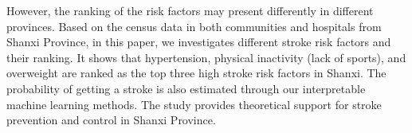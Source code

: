 \documentclass{article}
\begin{document}
 However, the ranking of the risk factors may present differently in different provinces. Based on the census data in both communities and hospitals from Shanxi Province, in this paper, we investigates different stroke risk factors and their ranking. It shows that hypertension, physical inactivity (lack of sports), and overweight are ranked as the top three high stroke risk factors in Shanxi. The probability of getting a stroke is also estimated through our interpretable machine learning methods. The study provides theoretical support for stroke prevention and control in Shanxi Province.
\begin{comment}
\subsection{Summary}
\begin{itemize}
    \setlength{\itemsep}{0pt}
    \setlength{\parsep}{0pt}
    \setlength{\parskip}{0pt}
    \item[1.] We rank the ``8+2" risk factors by using the Decision-Tree Model.
    \item[2.] The ranking of risk factors other than ``8+2" is given by using the Random-Forest Model.
    \item[3.] We quantify the probability of stroke incidence by using the logistic model. The features include lifestyle habits and the ``8+2" factors as these are easily accessible, and residents are able to use this model as a preliminary check by themselves. 
    \item[4.] In the discussion part, by comparing the 2016-data and 2017-2020 data, we propose a pipeline strategy in solving the data-imbalance problem.
    \item[5.] What's more, we investigate the influence of missing values with the permutation approach and using the average weight precision score and Recursive Feature Elimination(RFE) as the evaluation methods.
\end{itemize}

The Decision-Tree model shows that hypertension, physical inactivity, and hyperlipidemia are the top three factors in Shanxi province; The Random-Forest model shows that diastolic blood pressure, systolic blood pressure, physical inactivity, BMI, smoking, FBG, TG, HDL, and family history of Stroke are the top ten factors. The logistic model's result gives out the probability of stroke incidence: the average probability of stroke for the low-risk group is $0.1134$, the medium-risk group is $0.1935$, the high-risk group is $0.8528$, the stroke group is $0.9999$. 

Pipeline strategy has combined the One-vs.Rest and One-vs.One, which are two commonly used strategies in Multi-class classification. This strategy converts the multi-class classification into a step-by-step binary classification, and it is useful when the dataset is small and imbalanced. The results of the permutation approach and RFE show that diastolic blood pressure, physical inactivity, BMI, smoking, alcohol, HDL, and FBG are in order important factors when identifying the risk of stroke.
\end{comment}
\end{document}
